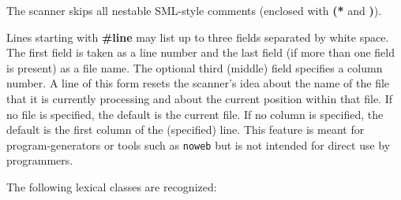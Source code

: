 \documentclass[titlepage,letterpaper]{article}
\begin{document}
The scanner skips all nestable SML-style comments (enclosed with {\bf
(*} and {\bf *)}).

Lines starting with {\bf \#line} may list up to three fields separated
by white space.  The first field is taken as a line number and the
last field (if more than one field is present) as a file name.  The
optional third (middle) field specifies a column number.  A line of
this form resets the scanner's idea about the name of the file that it
is currently processing and about the current position within that
file.  If no file is specified, the default is the current file.  If
no column is specified, the default is the first column of the
(specified) line.  This feature is meant for program-generators or
tools such as {\tt noweb} but is not intended for direct use by
programmers.

The following lexical classes are recognized:
\end{document}
